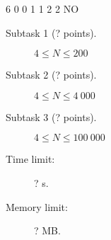 \documentclass{boi2014}
\begin{document}
	\example
	{
		6  0  0  1  1  2  2
	}
	{
		NO
	}

    \Scoring

    \begin{description}
        \item[Subtask 1 (? points).] $4 \le N \le 200$
        \item[Subtask 2 (? points).] $4 \le N \le 4\ 000$
        \item[Subtask 3 (? points).] $4 \le N \le 100\ 000$
    \end{description}

    \Constraints

    \begin{description}
        \item[Time limit:] ? s.
        \item[Memory limit:] ? MB.
    \end{description}
\end{document}
